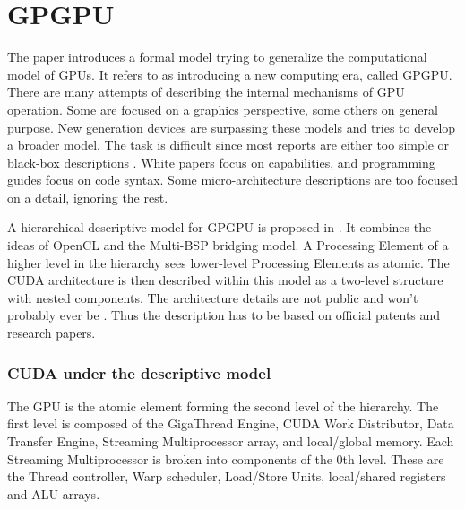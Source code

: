 
\section{GPGPU} \label{sec:gpgpu}


The paper \cite{Hu:2016:CLG:2891449.2873053} introduces a formal model trying to generalize the computational model of GPUs.
It refers to \cite{nickolls2010gpu} as introducing a new computing era, called GPGPU.
There are many attempts of describing the internal mechanisms of GPU operation.
Some are focused on a graphics perspective, some others on general purpose.
New generation devices are surpassing these models and \cite{Hu:2016:CLG:2891449.2873053} tries to develop a broader model.
The task is difficult since most reports are either too simple or black-box descriptions \cite{Hu:2016:CLG:2891449.2873053}.
White papers focus on capabilities, and programming guides focus on code syntax.
Some micro-architecture descriptions are too focused on a detail, ignoring the rest.

A hierarchical descriptive model for GPGPU is proposed in \cite{Hu:2016:CLG:2891449.2873053}.
It combines the ideas of OpenCL and the Multi-BSP \cite{valiant2008bridging} bridging model.
A Processing Element of a higher level in the hierarchy sees lower-level Processing Elements as atomic.
The CUDA architecture is then described within this model as a two-level structure with nested components.
The architecture details are not public and won't probably ever be \cite{voicu:fermi}.
Thus the description has to be based on official patents and research papers.

\subsubsection{CUDA under the descriptive model}
The GPU is the atomic element forming the second level of the hierarchy.
The first level is composed of the GigaThread Engine, CUDA Work Distributor, Data Transfer Engine, Streaming Multiprocessor array, and local/global memory.
Each Streaming Multiprocessor is broken into components of the 0th level.
These are the Thread controller, Warp scheduler, Load/Store Units, local/shared registers and ALU arrays.

